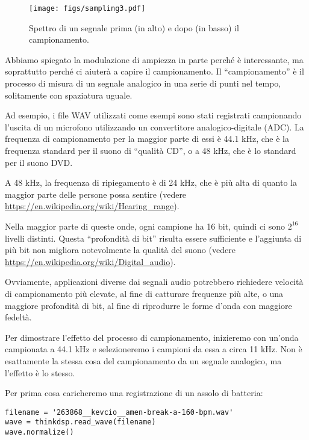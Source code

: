 \documentclass[12pt]{book} \usepackage[width=5.5in,height=8.5in, hmarginratio=3:2,vmarginratio=1:1]{geometry}
\begin{document}
\begin{figure} 

\centerline{\texttt{[image: figs/sampling3.pdf]}} \caption{Spettro di un segnale prima (in alto) e dopo (in basso) il campionamento.} \label{fig.sampling3} \end{figure} 

Abbiamo spiegato la modulazione di ampiezza in parte perché è interessante, ma soprattutto perché ci aiuterà a capire il campionamento. Il ``campionamento'' è il processo di misura di un segnale analogico in una serie di punti nel tempo, solitamente con spaziatura uguale.

Ad esempio, i file WAV utilizzati come esempi sono stati registrati campionando l'uscita di un microfono utilizzando un convertitore analogico-digitale (ADC). La frequenza di campionamento per la maggior parte di essi è 44.1 kHz, che è la frequenza standard per il suono di ``qualità CD'', o a 48 kHz, che è lo standard per il suono DVD.

A 48 kHz, la frequenza di ripiegamento è di 24 kHz, che è più alta di quanto la maggior parte delle persone possa sentire (vedere \url{https://en.wikipedia.org/wiki/Hearing_range}).

Nella maggior parte di queste onde, ogni campione ha 16 bit, quindi ci sono $2^{16}$ livelli distinti. Questa ``profondità di bit'' risulta essere sufficiente e l'aggiunta di più bit non migliora notevolmente la qualità del suono (vedere \url{https://en.wikipedia.org/wiki/Digital_audio}).

Ovviamente, applicazioni diverse dai segnali audio potrebbero richiedere velocità di campionamento più elevate, al fine di catturare frequenze più alte, o una maggiore profondità di bit, al fine di riprodurre le forme d'onda con maggiore fedeltà.

Per dimostrare l'effetto del processo di campionamento, inizieremo con un'onda campionata a 44.1 kHz e selezioneremo i campioni da essa a circa 11 kHz. Non è esattamente la stessa cosa del campionamento da un segnale analogico, ma l'effetto è lo stesso.

Per prima cosa caricheremo una registrazione di un assolo di batteria:

\begin{verbatim} 
filename = '263868__kevcio__amen-break-a-160-bpm.wav'
wave = thinkdsp.read_wave(filename)
wave.normalize()
 \end{verbatim} 
\end{document}
